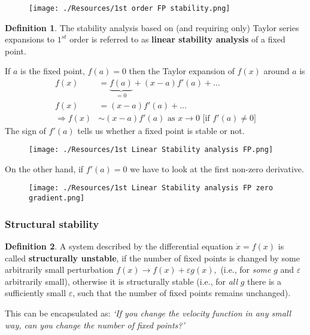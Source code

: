 \documentclass[12pt, a4paper]{article}
\newcommand{\imply}{\Rightarrow}
\theoremstyle{definition}
\newtheorem{definition}{Definition}[section]
\theoremstyle{plain}
\begin{document}
\begin{figure}[H]
\centering
\texttt{[image: ./Resources/1st order FP stability.png]}
\end{figure}

\begin{definition}
The stability analysis based on (and requiring only) Taylor series expansions to $1^{st}$ order is referred to as \textbf{linear stability analysis} of a fixed point.
\end{definition}

If $a$ is the fixed point, $f(a)=0$ then the Taylor expansion of $f(x)$ around $a$ is $$\begin{aligned}
f(x)&=\underbrace{f(a)}_{=0}+(x-a)f'(a)+\ldots \\
f(x)&=(x-a)f'(a)+\ldots\\
\imply f(x)&\sim (x-a)f'(a) \text{ as } x\to 0 \text{ [if $f'(a)\neq 0$]}
\end{aligned}$$ The sign of $f'(a)$ tells us whether a fixed point is stable or not.

\begin{figure}[H]
\centering
\texttt{[image: ./Resources/1st Linear Stability analysis FP.png]}
\end{figure}

On the other hand, if $f'(a)=0$ we have to look at the first non-zero derivative.

\begin{figure}[H]
\centering
\texttt{[image: ./Resources/1st Linear Stability analysis FP zero gradient.png]}
\end{figure}

\subsubsection{Structural stability}

\begin{definition}
A system described by the differential equation $\dot{x}=f(x)$ is called \textbf{structurally unstable}, if the number of fixed points is changed by some arbitrarily small perturbation $f(x) \to f (x) + \varepsilon g(x),$ (i.e., for \textit{some} $g$ and $\varepsilon$ arbitrarily small), otherwise it is structurally stable (i.e., for \textit{all} $g$ there is a sufficiently small $\varepsilon$, such that the number of fixed points remains unchanged).
\end{definition} 

This can be encapsulated as: \textit{`If you change the velocity function in any small way, can you change the number of fixed points?'}
\end{document}
